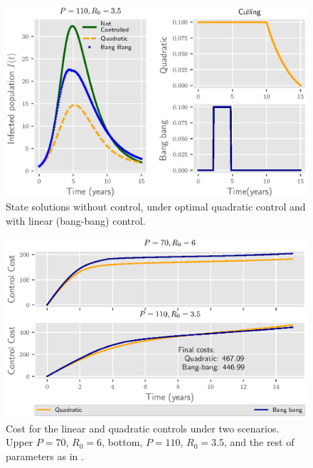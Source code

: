 \begin{figure}[H]
  \centering
  \includegraphics{Figures/figure_2_culling}
  \caption{State solutions without control, under optimal quadratic control 
  and with linear (bang-bang) control.}
  \label{fig:figure2culling}
\end{figure}

\begin{figure}[H]
  \centering
  \includegraphics{Figures/figure_3_culling}
  \caption{Cost for the linear and quadratic controls under two scenarios. Upper
  $P=70$, $R_0=6$, bottom, $P=110$, $R_0=3.5$, and the rest of parameters as 
  in .}
  \label{fig:figure3culling}
\end{figure}